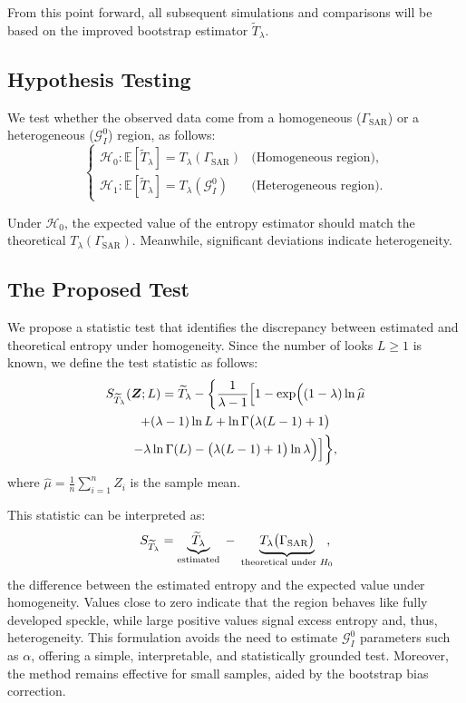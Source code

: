 \documentclass[
  lettersize  journal,
]{IEEEtran}%
\begin{document}
From this point forward, all subsequent simulations and comparisons will
be based on the improved bootstrap estimator
\(\widetilde{T}_{\lambda}\).

\subsection{Hypothesis Testing}\label{hypothesis-testing}

We test whether the observed data come from a homogeneous
(\(\Gamma_{\text{SAR}}\)) or a heterogeneous (\(\mathcal{G}^0_I\))
region, as follows: \begin{equation}\label{eq:hypothesis_test}
\begin{cases}
\mathcal{H}_0: \mathbb{E}[\widetilde{T}_{\lambda}] = T_{\lambda}(\Gamma_{\text{SAR}}) & \text{(Homogeneous region)}, \\[6pt]
\mathcal{H}_1: \mathbb{E}[\widetilde{T}_{\lambda}] = T_{\lambda}(\mathcal{G}^0_I) & \text{(Heterogeneous region)}.
\end{cases}
\end{equation}

Under \(\mathcal{H}_0\), the expected value of the entropy estimator
should match the theoretical \(T_{\lambda}(\Gamma_{\text{SAR}})\).
Meanwhile, significant deviations indicate heterogeneity.

\subsection{The Proposed Test}\label{the-proposed-test}

We propose a statistic test that identifies the discrepancy between
estimated and theoretical entropy under homogeneity. Since the number of
looks \(L\geq1\) is known, we define the test statistic as follows:
\begin{multline}
\label{eq-test-tsallis}
S_{\widetilde{T}_{\lambda}}(\bm{Z}; L) = \widetilde{T}_{\lambda} - \biggl\{ \frac{1}{\lambda - 1} \Bigl[ 1 -
\exp\Bigl(
(1 - \lambda)\ln \widehat{\mu}\\
+ (\lambda - 1)\ln L
+ \ln\Gamma\bigl(\lambda(L - 1) + 1\bigr) \\
- \lambda\ln\Gamma(L)
- \bigl(\lambda(L - 1) + 1\bigr)\ln \lambda
\Bigr) \Bigr] \biggr\},
\end{multline} where \(\widehat{\mu} = \frac{1}{n} \sum_{i=1}^n Z_i\) is
the sample mean.

This statistic can be interpreted as: \[
S_{\widetilde T_\lambda} 
= 
\underbrace{\widetilde T_\lambda}_{\text{estimated}} 
\;-\;
\underbrace{T_\lambda\bigl(\Gamma_{\mathrm{SAR}}\bigr)}_{\text{theoretical under } H_0}\hspace{-0.5em},
\] the difference between the estimated entropy and the expected value
under homogeneity. Values close to zero indicate that the region behaves
like fully developed speckle, while large positive values signal excess
entropy and, thus, heterogeneity. This formulation avoids the need to
estimate \(\mathcal{G}^0_I\) parameters such as \(\alpha\), offering a
simple, interpretable, and statistically grounded test. Moreover, the
method remains effective for small samples, aided by the bootstrap bias
correction.
\end{document}
